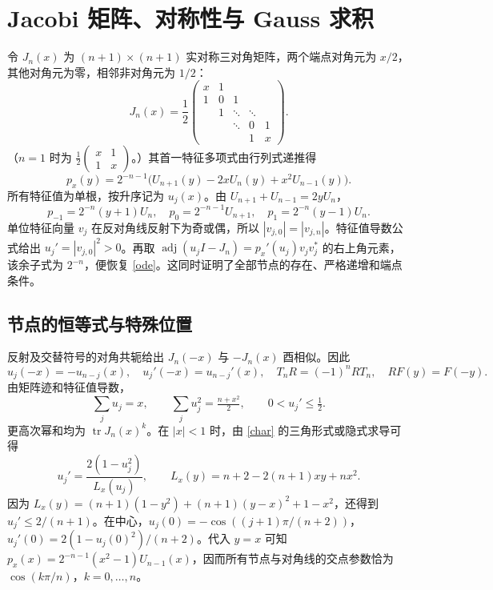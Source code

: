 \documentclass[11pt,a4paper,fontset=fandol]{ctexart}
\newcommand{\tr}{\operatorname{tr}}
\theoremstyle{remark}\newtheorem{conjecture}{猜想}
\begin{document}
\section{Jacobi 矩阵、对称性与 Gauss 求积}\label{sec:matrix}
令 $J_n(x)$ 为 $(n+1)\times(n+1)$ 实对称三对角矩阵，两个端点对角元为 $x/2$，其他对角元为零，相邻非对角元为 $1/2$：
\begin{equation}\label{J}
 J_n(x)=\frac12\begin{pmatrix}x&1&&&\\1&0&1&&\\&1&\ddots&\ddots&\\&&\ddots&0&1\\&&&1&x\end{pmatrix}.
\end{equation}
（$n=1$ 时为 $\frac12\left(\begin{smallmatrix}x&1\\1&x\end{smallmatrix}\right)$。）其首一特征多项式由行列式递推得
\begin{equation}\label{char}
 p_x(y)=2^{-n-1}\bigl(U_{n+1}(y)-2xU_n(y)+x^2U_{n-1}(y)\bigr).
\end{equation}
所有特征值为单根，按升序记为 $u_j(x)$。由 $U_{n+1}+U_{n-1}=2yU_n$，
\[
 p_{-1}=2^{-n}(y+1)U_n,\quad p_0=2^{-n-1}U_{n+1},\quad p_1=2^{-n}(y-1)U_n.
\]
单位特征向量 $v_j$ 在反对角线反射下为奇或偶，所以 $|v_{j,0}|=|v_{j,n}|$。特征值导数公式给出 $u_j'=|v_{j,0}|^2>0$。再取
$\operatorname{adj}(u_jI-J_n)=p_x'(u_j)v_jv_j^*$ 的右上角元素，该余子式为 $2^{-n}$，便恢复 \eqref{ode}。这同时证明了全部节点的存在、严格递增和端点条件。

\subsection{节点的恒等式与特殊位置}
反射及交替符号的对角共轭给出 $J_n(-x)$ 与 $-J_n(x)$ 酉相似。因此
\begin{equation}\label{sym}
 u_j(-x)=-u_{n-j}(x),\quad u_j'(-x)=u_{n-j}'(x),\quad T_nR=(-1)^nRT_n,
 \quad RF(y)=F(-y).
\end{equation}
由矩阵迹和特征值导数，
\[
 \sum_j u_j=x,\qquad \sum_j u_j^2=\tfrac{n+x^2}{2},\qquad 0<u_j'\le\tfrac12.
\]
更高次幂和均为 $\tr J_n(x)^k$。在 $|x|<1$ 时，由 \eqref{char} 的三角形式或隐式求导可得
\begin{equation}\label{speed}
 u_j'=\frac{2(1-u_j^2)}{L_x(u_j)},\qquad L_x(y)=n+2-2(n+1)xy+nx^2.
\end{equation}
因为 $L_x(y)=(n+1)(1-y^2)+(n+1)(y-x)^2+1-x^2$，还得到 $u_j'\le2/(n+1)$。在中心，$u_j(0)=-\cos((j+1)\pi/(n+2))$，$u_j'(0)=2(1-u_j(0)^2)/(n+2)$。代入 $y=x$ 可知 $p_x(x)=2^{-n-1}(x^2-1)U_{n-1}(x)$，因而所有节点与对角线的交点参数恰为 $\cos(k\pi/n)$，$k=0,\ldots,n$。
\end{document}

